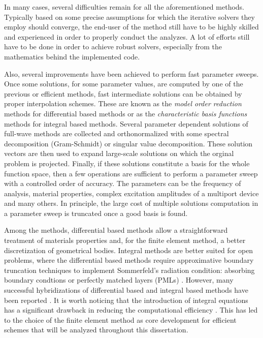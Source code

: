 In many cases, several difficulties remain for all the aforementioned methods. Typically based on some precise assumptions for which the iterative solvers they employ should converge, the end-user of the method still have to be highly skilled and experienced in order to properly conduct the analyzes. A lot of efforts still have to be done in order to achieve robust solvers, especially from the mathematics behind the implemented code.

Also, several improvements have been achieved to perform fast parameter sweeps. Once some solutions, for some parameter values, are computed by one of the previous  or efficient methods, fast intermediate solutions can be obtained by proper interpolation schemes. These are known as the \textit{model order reduction} methods \cite{farle2006multivariate, ntibarikure2012model} for differential based methods or as the \textit{characteristic basis functions} methods \cite{prakash2003characteristic} for integral based methods. Several parameter dependent solutions of full-wave methods are collected and orthonormalized with some spectral decomposition (Gram-Schmidt) or singular value decomposition. These solution vectors are then used to expand large-scale solutions on which the orginal problem is projected. Finally, if these solutions constitute a basis for the whole function space, then a few operations are sufficient to perform a parameter sweep with a controlled order of accuracy. The parameters can be the frequency of analysis, material properties, complex excitation amplitudes of a multiport device and many others. In principle, the large cost of multiple solutions computation in a parameter sweep is truncated once a good basis is found.

Among the  methods, differential based methods allow a straightforward treatment of materials properties and, for the finite element method, a better discretization of geometrical bodies. Integral methods are better suited for open problems, where the differential based methods require approximative boundary truncation techniques to implement Sommerfeld's radiation condition: absorbing boundary condtions \cite{Bayliss1982, Silvester1988} or perfectly matched layers (PMLs) \cite{Berenger1994}. However, many successful hybridizations of differential based and integral based methods have been reported \cite{xu1997hybrid, zhao2011efficient}. It is worth noticing that the introduction of integral equations has a significant drawback in reducing the computational efficiency \cite{zhao2006solving}. This has led to the choice of the finite element method as core development for efficient schemes that will be analyzed throughout this dissertation.

